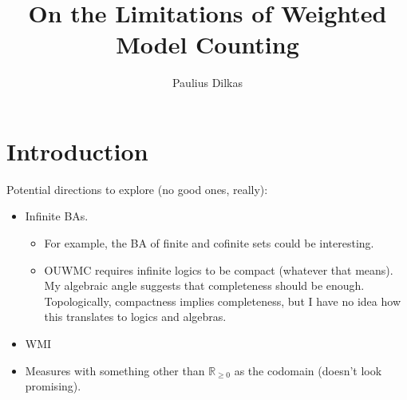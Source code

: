 \documentclass{article}
\title{On the Limitations of Weighted Model Counting}
\author{Paulius Dilkas}
\theoremstyle{definition}
\theoremstyle{remark}
\begin{document}
\maketitle

\section{Introduction}


Potential directions to explore (no good ones, really):
\begin{itemize}
\item Infinite BAs.
  \begin{itemize}
  \item For example, the BA of finite and cofinite sets could be interesting.
  \item OUWMC requires infinite logics to be compact (whatever that means). My
    algebraic angle suggests that completeness should be enough. Topologically,
    compactness implies completeness, but I have no idea how this translates to
    logics and algebras.
  \end{itemize}
\item WMI
\item Measures with something other than $\mathbb{R}_{\ge 0}$ as the codomain
  (doesn't look promising).
\end{itemize}
\end{document}
